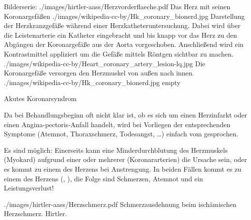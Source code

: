 
\begin{PictureSeriesWide}{}{Bilderserie:
}
{./images/hirtler-aass/Herzvorderflaeche.pdf}
{Das Herz mit seinen Koronargefäßen }
{./images/wikipedia-cc-by/Hk_coronary_bionerd.jpg}
{Darstellung der
Herzkranzgefäße während einer Herzkatheteruntersuchung.
Dabei wird über die Leistenarterie ein Katheter
eingebracht und bis knapp vor das Herz zu den Abgängen der
Koronargefäße aus der Aorta vorgeschoben. Anschließend wird ein
Kontrastmittel appliziert um die Gefäße mittels Röntgen sichtbar zu machen.
}
{./images/wikipedia-cc-by/Heart_coronary_artery_lesion-lq.jpg}
{Die Koronargefäße versorgen den
Herzmuskel von außen nach innen. } {./images/wikipedia-cc-by/Hk_coronary_bionerd.jpg}
{empty}
{}

\end{PictureSeriesWide}

{Akutes Koronarsyndrom}
{Da bei Behandlungsbeginn oft nicht klar ist, ob es sich um
einen Herzinfarkt oder einen Angina-pectoris-Anfall handelt,
wird bei Vorliegen der entsprechenden Symptome (Atemnot,
Thoraxschmerz, Todesangst, \ldots) einfach vom  gesprochen. 

Es sind  möglich:
Einerseits kann eine Minderdurchblutung des Herzmuskels
(Myokard)
  aufgrund einer oder mehrerer  (Koronararterien) die Ursache sein, oder
es kommt zu einem  des Herzens
bei
  Anstrengung.
In beiden Fällen kommt es zu einem  des
Herzens (,
), die Folge sind Schmerzen,
Atemnot und ein Leistungsverlust!


}
{}
{./images/hirtler-aass/Herzschmerz.pdf}
{Schmerzausdehnung beim ischämischen
Herzschmerz.}
{Hirtler.}

